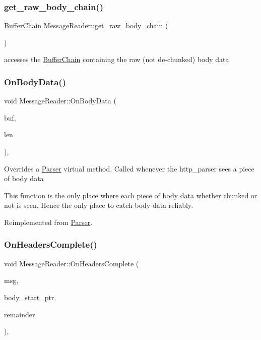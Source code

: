 \subsubsection{\texorpdfstring{get\+\_\+raw\+\_\+body\+\_\+chain()}{get\_raw\_body\_chain()}}
{\footnotesize\ttfamily \hyperlink{class_buffer_chain}{Buffer\+Chain} Message\+Reader\+::get\+\_\+raw\+\_\+body\+\_\+chain (\begin{DoxyParamCaption}{ }\end{DoxyParamCaption})}

accesses the \hyperlink{class_buffer_chain}{Buffer\+Chain} containing the raw (not de-\/chunked) body data \mbox{\label{class_message_reader_a4f01917ce0c7c84159f81f797a7d13ec}} 
\subsubsection{\texorpdfstring{On\+Body\+Data()}{OnBodyData()}}
{\footnotesize\ttfamily void Message\+Reader\+::\+On\+Body\+Data (\begin{DoxyParamCaption}\item[{void $\ast$}]{buf,  }\item[{int}]{len }\end{DoxyParamCaption})\hspace{0.3cm}{\ttfamily [protected]}, {\ttfamily [virtual]}}

Overrides a \hyperlink{class_parser}{Parser} virtual method. Called whenever the http\+\_\+parser sees a piece of body data

This function is the only place where each piece of body data whether chunked or not is seen. Hence the only place to catch body data reliably. 

Reimplemented from \hyperlink{class_parser}{Parser}.

\mbox{\label{class_message_reader_a813dbc29f75b43f36ef3f770cc39c3e7}} 
\subsubsection{\texorpdfstring{On\+Headers\+Complete()}{OnHeadersComplete()}}
{\footnotesize\ttfamily void Message\+Reader\+::\+On\+Headers\+Complete (\begin{DoxyParamCaption}\item[{\hyperlink{class_message_interface}{Message\+Interface} $\ast$}]{msg,  }\item[{void $\ast$}]{body\+\_\+start\+\_\+ptr,  }\item[{std\+::size\+\_\+t}]{remainder }\end{DoxyParamCaption})\hspace{0.3cm}{\ttfamily [protected]}, {\ttfamily [virtual]}}

